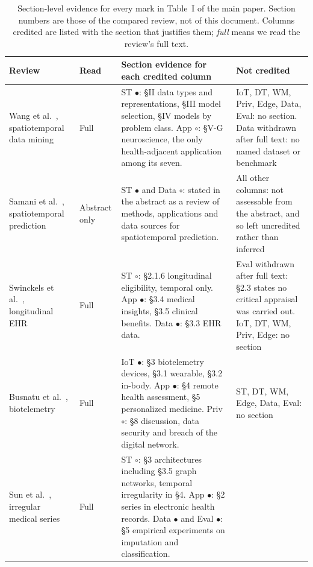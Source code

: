 \documentclass[journal]{IEEEtran}
\begin{document}
\begin{table}[tbp]
\centering
\caption{Section-level evidence for every mark in Table~I of the main paper. Section numbers are
those of the compared review, not of this document. Columns credited are listed with the section
that justifies them; \emph{full} means we read the review's full text.}
\label{tab:surveyevidence}
\footnotesize
\setlength{\tabcolsep}{3pt}
\renewcommand{\arraystretch}{1.1}
\begin{tabularx}{\textwidth}{L{2.45cm} L{1.15cm} X L{2.5cm}}
\toprule
\textbf{Review} & \textbf{Read} & \textbf{Section evidence for each credited column} & \textbf{Not credited} \\
\midrule
Wang et al.~\cite{wang2022deep}, spatiotemporal data mining &
Full &
ST $\bullet$: \S II data types and representations, \S III model selection, \S IV models by problem class. App $\circ$: \S V-G neuroscience, the only health-adjacent application among its seven. &
IoT, DT, WM, Priv, Edge, Data, Eval: no section. Data withdrawn after full text: no named dataset or benchmark \\
\addlinespace[2pt]
Samani et al.~\cite{samani2026stdl}, spatiotemporal prediction &
Abstract only &
ST $\bullet$ and Data $\circ$: stated in the abstract as a review of methods, applications and data sources for spatiotemporal prediction. &
All other columns: not assessable from the abstract, and so left uncredited rather than inferred \\
\addlinespace[2pt]
Swinckels et al.~\cite{swinckels2024ehr}, longitudinal EHR &
Full &
ST $\circ$: \S 2.1.6 longitudinal eligibility, temporal only. App $\bullet$: \S 3.4 medical insights, \S 3.5 clinical benefits. Data $\bullet$: \S 3.3 EHR data. &
Eval withdrawn after full text: \S 2.3 states no critical appraisal was carried out. IoT, DT, WM, Priv, Edge: no section \\
\addlinespace[2pt]
Busnatu et al.~\cite{Busnatu2022}, biotelemetry &
Full &
IoT $\bullet$: \S 3 biotelemetry devices, \S 3.1 wearable, \S 3.2 in-body. App $\bullet$: \S 4 remote health assessment, \S 5 personalized medicine. Priv $\circ$: \S 8 discussion, data security and breach of the digital network. &
ST, DT, WM, Edge, Data, Eval: no section \\
\addlinespace[2pt]
Sun et al.~\cite{sun2026irregularmedical}, irregular medical series &
Full &
ST $\circ$: \S 3 architectures including \S 3.5 graph networks, temporal irregularity in \S 4. App $\bullet$: \S 2 series in electronic health records. Data $\bullet$ and Eval $\bullet$: \S 5 empirical experiments on imputation and classification. &

\end{tabularx}
\end{table}
\end{document}

